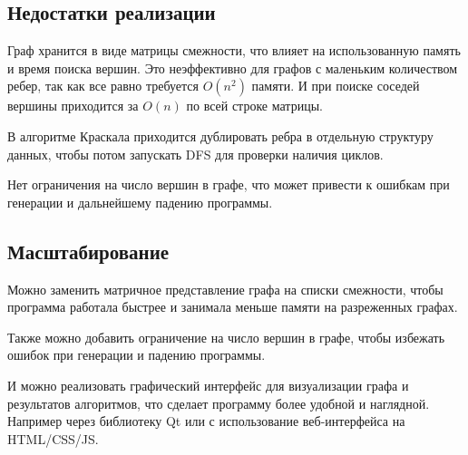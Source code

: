 \subsection*{Недостатки реализации}

Граф хранится в виде матрицы смежности, что влияет на использованную память и время поиска вершин. Это неэффективно для графов с маленьким количеством ребер, так как все равно требуется $O(n^2)$ памяти. И при поиске соседей вершины приходится за $O(n)$ по всей строке матрицы.

В алгоритме Краскала приходится дублировать ребра в отдельную структуру данных, чтобы потом запускать DFS для проверки наличия циклов.

Нет ограничения на число вершин в графе, что может привести к ошибкам при генерации и дальнейшему падению программы.
\subsection*{Масштабирование}

Можно заменить матричное представление графа на списки смежности,
чтобы программа работала быстрее и занимала меньше памяти на разреженных
графах.

Также можно добавить ограничение на число вершин в графе, чтобы избежать ошибок при генерации и падению программы.

И можно реализовать графический интерфейс для визуализации графа и результатов алгоритмов, что сделает программу более удобной и наглядной. Например через библиотеку Qt или с использование веб-интерфейса на HTML/CSS/JS.